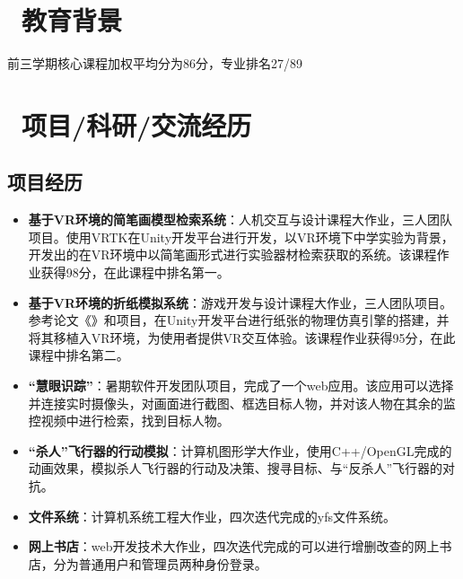 \documentclass{resume}
\begin{document}


  
\section{\faGraduationCap\  教育背景}
前三学期核心课程加权平均分为86分，专业排名27/89

\section{\faUsers\ 项目/科研/交流经历}
\subsection{\textbf{项目经历}}
\begin{itemize}
  \item \textbf{基于VR环境的简笔画模型检索系统}：人机交互与设计课程大作业，三人团队项目。使用VRTK在Unity开发平台进行开发，以VR环境下中学实验为背景，开发出的在VR环境中以简笔画形式进行实验器材检索获取的系统。该课程作业获得98分，在此课程中排名第一。
  \item \textbf{基于VR环境的折纸模拟系统}：游戏开发与设计课程大作业，三人团队项目。参考论文《》和项目，在Unity开发平台进行纸张的物理仿真引擎的搭建，并将其移植入VR环境，为使用者提供VR交互体验。该课程作业获得95分，在此课程中排名第二。
  \item \textbf{“慧眼识踪”}：暑期软件开发团队项目，完成了一个web应用。该应用可以选择并连接实时摄像头，对画面进行截图、框选目标人物，并对该人物在其余的监控视频中进行检索，找到目标人物。
  \end{itemize}
\begin{itemize}
  \item \textbf{“杀人”飞行器的行动模拟}：计算机图形学大作业，使用C++/OpenGL完成的动画效果，模拟杀人飞行器的行动及决策、搜寻目标、与“反杀人”飞行器的对抗。
  \item \textbf{文件系统}：计算机系统工程大作业，四次迭代完成的yfs文件系统。
  \item \textbf{网上书店}：web开发技术大作业，四次迭代完成的可以进行增删改查的网上书店，分为普通用户和管理员两种身份登录。
\end{itemize}
\end{document}

